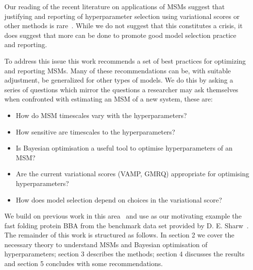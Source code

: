 \documentclass[journal=jacsat,manuscript=article]{achemso}
\begin{document}
Our reading of the recent literature on applications of MSMs suggest that justifying and reporting of hyperparameter selection using variational scores or other methods is rare~\cite{koulgi_structural_2021, dutta_distinct_2022, fernandez-quintero_cdr_2022, ibrahim_dynamics_2022, linker_polarapolar_2022, hu_discovery_2022, cannariato_prediction_2022, pantsar_decisive_2022, fernandez-quintero_mutation_2021, paul_thermodynamics_2021, quoika_implementation_2021, hempel_molecular_2021, zhou_molecular_2021,song_modulation_2021, sadiq_multiscale_2021, jones_determining_2021, zhu_critical_2021, bergh_markov_2021, grabski_molecular_ 2021, tosstorff_study_2020, kahler_sodium-induced_2020, tian_deciphering_2020, sharma_comparative_2020, mckiernan_dynamical_2020}.  While we do not suggest that this constitutes a crisis, it does suggest that more can be done to promote good model selection practice and reporting. 

To address this issue this work recommends a set of best practices for optimizing and reporting MSMs. Many of these recommendations can be, with suitable adjustment, be generalized for other types of models. We do this by asking a series of questions which mirror the questions a researcher may ask themselves when confronted with estimating an MSM of a new system, these are: 

\begin{itemize}
    \item How do MSM timescales vary with the hyperparameters? 
    \item How sensitive are timescales to the hyperparameters? 
    \item Is Bayesian optimisation a useful tool to optimise hyperparameters of an MSM? 
    \item Are the current variational scores (VAMP, GMRQ) appropriate for optimising hyperparameters? 
    \item How does model selection depend on choices in the variational score? 
\end{itemize}

We build on previous work in this area~\cite{Optimized_2016} and use as our motivating example the fast folding protein BBA from the benchmark data set provided by D. E. Sharw~\cite{lindorff-larsen_how_2011}. 
The remainder of this work is structured as follows.  In section 2 we cover the necessary theory to understand MSMs and Bayesian optimisation of hyperparameters; section 3 describes the methods; section 4 discusses the results and section 5 concludes with some recommendations. 
\end{document}

